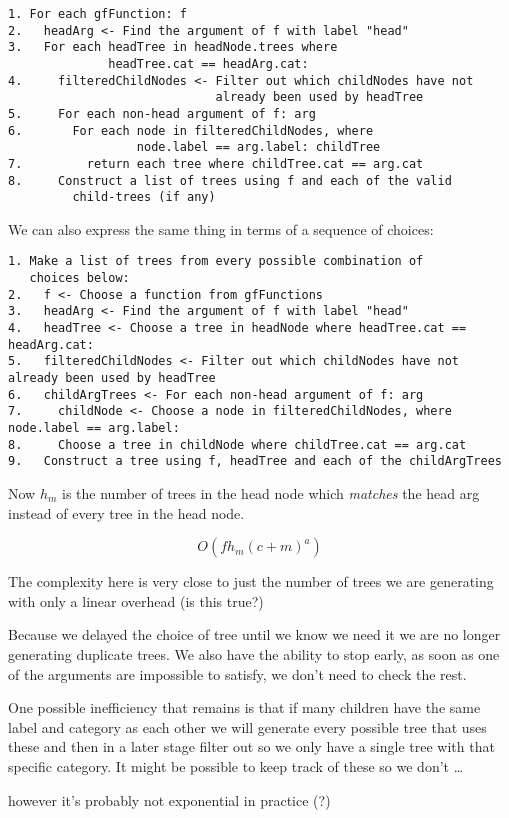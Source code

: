 \begin{verbatim}
1. For each gfFunction: f
2.   headArg <- Find the argument of f with label "head"
3.   For each headTree in headNode.trees where
              headTree.cat == headArg.cat:
4.     filteredChildNodes <- Filter out which childNodes have not
                             already been used by headTree
5.     For each non-head argument of f: arg
6.       For each node in filteredChildNodes, where
                  node.label == arg.label: childTree
7.         return each tree where childTree.cat == arg.cat
8.     Construct a list of trees using f and each of the valid
         child-trees (if any)
\end{verbatim}

We can also express the same thing in terms of a sequence of choices:

\begin{verbatim}
1. Make a list of trees from every possible combination of
   choices below:
2.   f <- Choose a function from gfFunctions
3.   headArg <- Find the argument of f with label "head"
4.   headTree <- Choose a tree in headNode where headTree.cat == headArg.cat:
5.   filteredChildNodes <- Filter out which childNodes have not already been used by headTree
6.   childArgTrees <- For each non-head argument of f: arg
7.     childNode <- Choose a node in filteredChildNodes, where node.label == arg.label:
8.     Choose a tree in childNode where childTree.cat == arg.cat
9.   Construct a tree using f, headTree and each of the childArgTrees
\end{verbatim}

Now $h_m$ is the number of trees in the head node which \emph{matches} the head arg instead of every tree in the head node.

$$
O(f h_m (c+m)^a)
$$

The complexity here is very close to just the number of trees we are generating with only a linear overhead (is this true?)

Because we delayed the choice of tree until we know we need it we are no longer generating duplicate trees.
We also have the ability to stop early, as soon as one of the arguments are impossible to satisfy, we don't need to check the rest.

One possible inefficiency that remains is that if many children have the same label and category as each other we will
generate every possible tree that uses these and then in a later stage filter out so we only have a single tree with that specific category. It might be possible to keep track of these so we don't \dots

however it's probably not exponential in practice (?)


